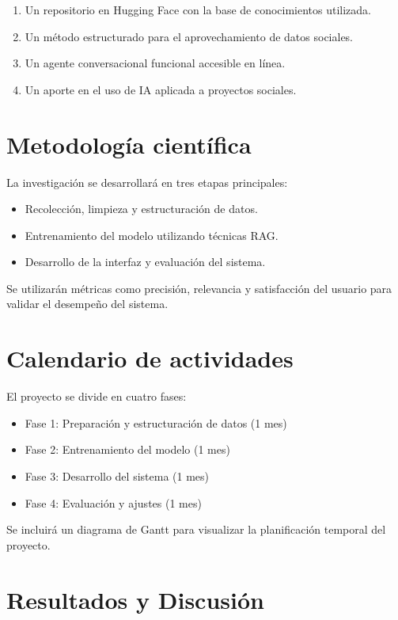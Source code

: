 \documentclass{article}
\begin{document}
\begin{enumerate}
\item Un repositorio en Hugging Face con la base de conocimientos utilizada.
\item Un método estructurado para el aprovechamiento de datos sociales.
\item Un agente conversacional funcional accesible en línea.
\item Un aporte en el uso de IA aplicada a proyectos sociales.
\end{enumerate}

\section{Metodología científica}

La investigación se desarrollará en tres etapas principales:

\begin{itemize}
\item Recolección, limpieza y estructuración de datos.
\item Entrenamiento del modelo utilizando técnicas RAG.
\item Desarrollo de la interfaz y evaluación del sistema.
\end{itemize}

Se utilizarán métricas como precisión, relevancia y satisfacción del usuario para validar el desempeño del sistema.

\section{Calendario de actividades}

El proyecto se divide en cuatro fases:

\begin{itemize}
\item Fase 1: Preparación y estructuración de datos (1 mes)
\item Fase 2: Entrenamiento del modelo (1 mes)
\item Fase 3: Desarrollo del sistema (1 mes)
\item Fase 4: Evaluación y ajustes (1 mes)
\end{itemize}

Se incluirá un diagrama de Gantt para visualizar la planificación temporal del proyecto.

\section{Resultados y Discusión}
\end{document}
